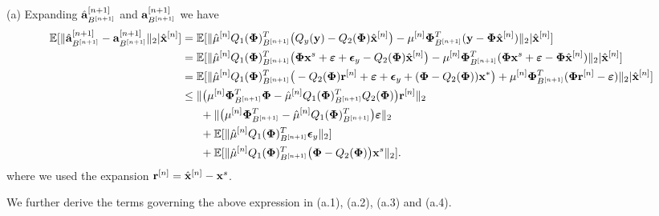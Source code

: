 \documentclass[11pt]{article}
\begin{document}
{(a)} Expanding $\hat{{\bf a}}_{B^{[n+1]}}^{[n+1]}$ and ${{\bf a}}_{B^{[n+1]}}^{[n+1]}$ we have
\begin{equation}\label{quantization_error_terms}
    \begin{split}
      \mathbb{E}[  \|\hat{{\bf a}}_{B^{[n+1]}}^{[n+1]} - {{\bf a}}_{B^{[n+1]}}^{[n+1]} \|_2| \hat{{\bf x}}^{[n]}] &= \mathbb{E}[\|\hat{\mu}^{[n]}Q_1({\bf {\bf \Phi}})_{B^{[n+1]}}^T\big(Q_y({\bf y})-Q_2({\bf {\bf \Phi}})\hat{{\bf x}}^{[n]}\big) - {\mu}^{[n]}{\bf {\bf \Phi}}_{B^{[n+1]}}^T({\bf y}-{\bf {\bf \Phi}}\hat{{\bf x}}^{[n]}) \|_2| \hat{{\bf x}}^{[n]}]\\
        &=\mathbb{E}[\|\hat{\mu}^{[n]}Q_1({\bf {\bf \Phi}})_{B^{[n+1]}}^T\big({\bf {\bf \Phi}} {\bf x}^s +\boldsymbol{\varepsilon}+\boldsymbol{\epsilon}_y-Q_2({\bf {\bf \Phi}})\hat{{\bf x}}^{[n]}\big) - {\mu}^{[n]}{\bf {\bf \Phi}}_{B^{[n+1]}}^T({\bf {\bf \Phi}}{\bf x}^s +\boldsymbol{\varepsilon}-{\bf {\bf \Phi}}\hat{{\bf x}}^{[n]}) \|_2| \hat{{\bf x}}^{[n]}]\\
        &=\mathbb{E}[\|\hat{\mu}^{[n]}Q_1({\bf {\bf \Phi}})_{B^{[n+1]}}^T\big(-Q_2({\bf {\bf \Phi}}) {\bf r}^{[n]} +\boldsymbol{\varepsilon}+\boldsymbol{\epsilon}_y+({\bf {\bf \Phi}}-Q_2({\bf {\bf \Phi}})){\bf x}^{*}\big)+{\mu}^{[n]}{\bf {\bf \Phi}}_{B^{[n+1]}}^T({\bf {\bf \Phi}}{\bf r}^{[n]} -\boldsymbol{\varepsilon}) \|_2| \hat{{\bf x}}^{[n]}]\\
        &\leq \|\big(\mu^{[n]}{\bf {\bf \Phi}}_{B^{[n+1]}}^T{\bf {\bf \Phi}} - \hat{\mu}^{[n]}Q_1({\bf {\bf \Phi}})_{B^{[n+1]}}^T Q_2({\bf {\bf \Phi}})\big) {\bf r}^{[n]} \|_2\\
        &\ \ \ \ \  +\|\big(\mu^{[n]}{\bf {\bf \Phi}}_{B^{[n+1]}}^T - \hat{\mu}^{[n]}Q_1({\bf {\bf \Phi}})_{B^{[n+1]}}^T \big)\boldsymbol{\varepsilon} \|_2\\
     &\ \ \ \  \  +\mathbb{E}[\|\hat{\mu}^{[n]}Q_1({\bf {\bf \Phi}})_{B^{[n+1]}}^T\boldsymbol{\epsilon}_y \|_2]\\
     &\ \ \ \  \  +\mathbb{E}[\| \hat{\mu}^{[n]}Q_1({\bf \Phi})_{B^{[n+1]}}^T\big({\bf {\bf \Phi}}-Q_2({\bf {\bf \Phi}})\big){\bf x}^s \|_2].
    \end{split}
\end{equation}
where we used the expansion ${{\bf r}}^{[n]} = \hat{{\bf x}}^{[n]}-{\bf x}^s$.

We further derive the terms governing the above expression in (a.1), (a.2), (a.3) and (a.4). 
\end{document}
